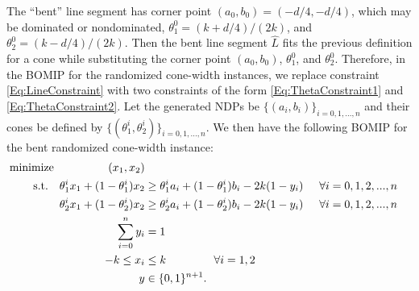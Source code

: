 \documentclass[11pt]{article} %
\begin{document}
The ``bent'' line segment has corner point $(a_0, b_0)=(-d/4, -d/4)$, which may be dominated or nondominated, $\theta^0_1=(k+d/4)/(2k)$, and $\theta^0_2=(k-d/4)/(2k)$. Then the bent line segment $\hat{L}$ fits the previous definition for a cone while substituting the corner point $(a_0,b_0)$, $\theta^0_1$, and $\theta^0_2$. Therefore, in the BOMIP for the randomized cone-width instances, we replace constraint \eqref{Eq:LineConstraint} with two constraints of the form \eqref{Eq:ThetaConstraint1} and \eqref{Eq:ThetaConstraint2}. Let the generated NDPs be $\{(a_i,b_i)\}_{i=0,1,...,n}$ and their cones be defined by $\{(\theta^i_1,\theta^i_2)\}_{i=0,1,...,n}$. We then have the following BOMIP for the bent randomized cone-width instance:
\begin{align}
\text{minimize}\hspace{1.7cm} (x_1,x_2) \nonumber \\
\text{s.t.}\quad \theta^i_1 x_1 + (1-\theta^i_1)x_2 &\geq \theta^i_1 a_i + (1-\theta^i_1)b_i -2k(1-y_i) \hspace{0.5cm} \forall i=0,1,2,...,n \\
\theta^i_2 x_1 + (1-\theta^i_2)x_2 &\geq \theta^i_2 a_i + (1-\theta^i_2)b_i -2k(1-y_i) \hspace{0.5cm} \forall i=0,1,2,...,n \\
\sum_{i=0}^n y_i &=1 \\
-k \leq x_i &\leq k \hspace{1.5cm} \forall i=1,2 \\
y&\in\{0,1\}^{n+1}. \nonumber
\end{align}


\end{document}
